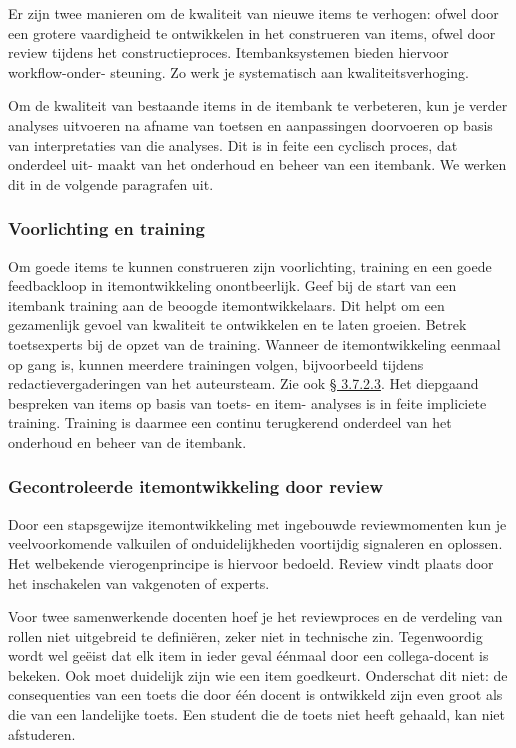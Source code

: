 \documentclass[
]{book}
\begin{document}
Er zijn twee manieren om de kwaliteit van nieuwe items te verhogen: ofwel door een grotere vaardigheid te ontwikkelen in het construeren van items, ofwel door review tijdens het constructieproces. Itembanksystemen bieden hiervoor workflow-onder- steuning. Zo werk je systematisch aan kwaliteitsverhoging.

Om de kwaliteit van bestaande items in de itembank te verbeteren, kun je verder analyses uitvoeren na afname van toetsen en aanpassingen doorvoeren op basis van interpretaties van die analyses. Dit is in feite een cyclisch proces, dat onderdeel uit- maakt van het onderhoud en beheer van een itembank. We werken dit in de volgende paragrafen uit.

\hypertarget{voorlichting-en-training}{%
\subsubsection{Voorlichting en training}\label{voorlichting-en-training}}

Om goede items te kunnen construeren zijn voorlichting, training en een goede feedbackloop in itemontwikkeling onontbeerlijk. Geef bij de start van een itembank training aan de beoogde itemontwikkelaars. Dit helpt om een gezamenlijk gevoel van kwaliteit te ontwikkelen en te laten groeien. Betrek toetsexperts bij de opzet van de training. Wanneer de itemontwikkeling eenmaal op gang is, kunnen meerdere trainingen volgen, bijvoorbeeld tijdens redactievergaderingen van het auteursteam. Zie ook \protect\hyperlink{itembankonderhoud-en-beheer}{§ 3.7.2.3}. Het diepgaand bespreken van items op basis van toets- en item- analyses is in feite impliciete training. Training is daarmee een continu terugkerend onderdeel van het onderhoud en beheer van de itembank.

\hypertarget{gecontroleerde-itemontwikkeling-door-review}{%
\subsubsection{Gecontroleerde itemontwikkeling door review}\label{gecontroleerde-itemontwikkeling-door-review}}

Door een stapsgewijze itemontwikkeling met ingebouwde reviewmomenten kun je veelvoorkomende valkuilen of onduidelijkheden voortijdig signaleren en oplossen. Het welbekende vierogenprincipe is hiervoor bedoeld. Review vindt plaats door het inschakelen van vakgenoten of experts.

Voor twee samenwerkende docenten hoef je het reviewproces en de verdeling van rollen niet uitgebreid te definiëren, zeker niet in technische zin. Tegenwoordig wordt wel geëist dat elk item in ieder geval éénmaal door een collega-docent is bekeken. Ook moet duidelijk zijn wie een item goedkeurt. Onderschat dit niet: de consequenties van een toets die door één docent is ontwikkeld zijn even groot als die van een landelijke toets. Een student die de toets niet heeft gehaald, kan niet afstuderen.
\end{document}
